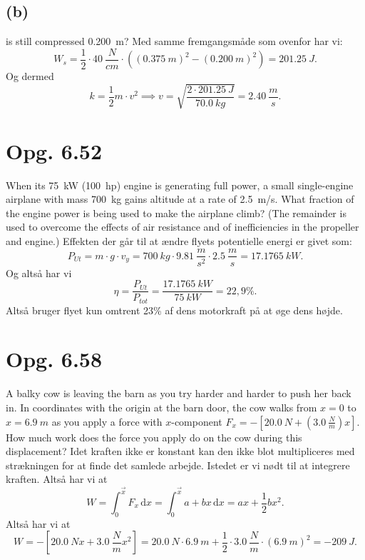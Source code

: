 \documentclass[12pt]{article}
\begin{document}
\subsection*{(b)}
is still compressed \qty{0,200}{m}?
\bigbreak
Med samme fremgangsmåde som ovenfor har vi:
\[
W_s = \frac{1}{2}\cdot \qty{40}{\frac{N}{cm}}\cdot \left( \left( \qty{0,375}{m} \right)^2 - \left( \qty{0,200}{m} \right)^2 \right) = \qty{201,25}{J}
.\] 
Og dermed
\[
k = \frac{1}{2}m\cdot v^2 \implies v = \sqrt{\frac{2\cdot \qty{201,25}{J}}{\qty{70,0}{kg}}} = \qty{2,40}{\frac{m}{s}} 
.\] 


\section*{Opg. 6.52}
When its \qty{75}{kW} (\qty{100}{hp}) engine is generating full power, a small single-engine airplane with mass \qty{700}{kg} gains altitude at a rate of \qty{2,5}{m/s}. What fraction of the engine power is being used to make the airplane climb? (The remainder is used to overcome the effects of air resistance and of inefficiencies in the propeller and engine.)
\bigbreak
Effekten der går til at ændre flyets potentielle energi er givet som:
\[
  P_{Ut} = m\cdot g\cdot v_y = \qty{700}{kg}\cdot \qty{9,81}{\frac{m}{s^2}}\cdot \qty{2,5}{\frac{m}{s}} = \qty{17,1765}{kW}
.\] 
Og altså har vi
\[
\eta = \frac{P_{Ut}}{P_{tot}} = \frac{\qty{17,1765}{kW}}{\qty{75}{kW}} = 22,9\%
.\] 
Altså bruger flyet kun omtrent 23\% af dens motorkraft på at øge dens højde.


\section*{Opg. 6.58}
A balky cow is leaving the barn as you try harder and harder to push her back in. In coordinates with the origin at the barn door, the cow walks from $x = 0$ to  $x = \qty{6,9}{m}$ as you apply a force with $x$-component $F_x = -\left[ \qty{20,0}{N} + \left( \qty{3,0}{\frac{N}{m}} \right)x  \right]$. How much work does the force you apply do on the cow during this displacement?
\bigbreak
Idet kraften ikke er konstant kan den ikke blot multipliceres med strækningen for at finde det samlede arbejde. Istedet er vi nødt til at integrere kraften. Altså har vi at
\[
W = \int_0^{\Vec{x}} F_x \, \mathrm{d}x = \int_0^{\Vec{x}} a + bx \, \mathrm{d}x = ax + \frac{1}{2}bx^2 
.\]
Altså har vi at 
\[
  W = - [\qty{20,0}{N}x + \qty{3,0}{\frac{N}{m}}x^2] = \qty{20,0}{N}\cdot \qty{6,9}{m} + \frac{1}{2}\cdot \qty{3,0}{\frac{N}{m}}\cdot \left( \qty{6,9}{m} \right)^2 = - \qty{209}{J} 
.\] 
\end{document}
